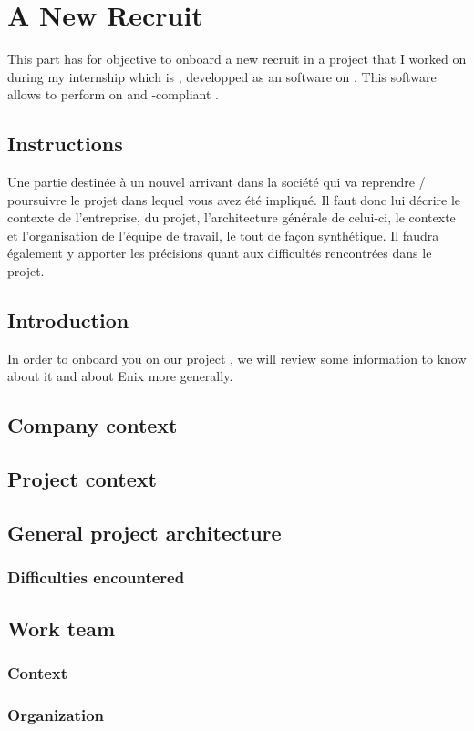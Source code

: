 \chapter{A New Recruit}

This part has for objective to onboard a new recruit in a project that I worked on during my internship which is \saniscsicsi, developped as an  software on . This software allows to perform  on  and -compliant .

\section{Instructions}
\color{red}
Une partie destinée à un nouvel arrivant dans la société qui va reprendre / poursuivre le projet dans lequel vous avez été impliqué. Il faut donc lui décrire le contexte de l’entreprise, du projet, l’architecture générale de celui-ci, le contexte et l’organisation de l’équipe de travail, le tout de façon synthétique. Il faudra également y apporter les précisions quant aux difficultés rencontrées dans le projet.
\color{black}

\clearpage

\section{Introduction}

In order to onboard you on our project \saniscsicsi, we will review some information to know about it and about Enix more generally.

\section{Company context}

\section{Project context}

\section{General project architecture}
\subsection{Difficulties encountered}

\section{Work team}
\subsection{Context}
\subsection{Organization}

\clearpage
